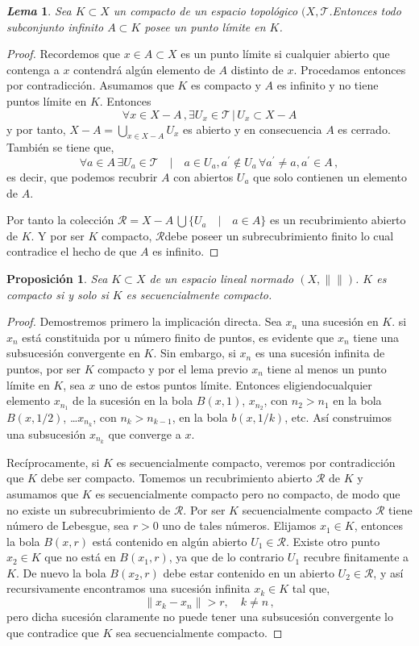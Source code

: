 \documentclass[12pt]{book}
\newtheorem{prop}{\bf Proposición}[chapter]
\newtheorem{lema}{\it Lema}[chapter]
\newcommand{\norm}[1]{\lVert #1\rVert }
\begin{document}
\begin{lema}
Sea $K\subset X$ un  compacto  de un espacio topológico $(X,\mathcal{T}$.Entonces todo 
subconjunto infinito $A\subset K$ posee un punto límite en $K$.
\end{lema}
\begin{proof}
Recordemos que $x\in A\subset X$ es un punto límite  si cualquier abierto  que contenga a $x$ 
contendrá algún elemento de $A$ distinto de $x$.  Procedamos entonces  por contradicción. 
Asumamos que  $K$ es compacto y $A$ es infinito y no tiene puntos límite en $K$. Entonces 
$$\forall x\in X-A\,, \exists U_x\in\mathcal{T}\,|\, U_x\subset X-A$$ 
y por tanto, $X-A=\bigcup_{x\in X-A} U_x$ es abierto y en consecuencia   $A$ es cerrado. También 
se tiene que,
$$\forall a\in A\,\exists  U_a\in\mathcal{T}\quad|\quad a\in U_a, a^\prime\not\in U_a\,\forall 
a^\prime\not=a, a^\prime\in A\,,$$
es decir, que podemos recubrir $A$ con abiertos $U_a$ que solo contienen un elemento de $A$.

Por tanto la colección $\mathcal{R}=X-A\,\bigcup \{ U_a \quad|\quad a\in A\}$ es un recubrimiento 
abierto de $K$. Y por ser $K$ compacto, $\mathcal{R}$debe poseer  un subrecubrimiento finito lo 
cual contradice el hecho de que $A$ es  infinito.
\end{proof}
\begin{prop}
Sea  $K\subset X$  de un espacio lineal normado $(X,\norm{})$. $K$ es compacto si y solo  si $K$ 
es secuencialmente compacto.
\end{prop}
\begin{proof}
Demostremos primero la implicación directa. Sea $x_n$ una sucesión en $K$. si $x_n$ está 
constituida por u número finito de puntos, es evidente que $x_n$ tiene una subsucesión 
convergente en $K$. Sin embargo, si $x_n$  es una sucesión infinita de puntos,  por ser $K$ 
compacto y por el lema previo $x_n$ tiene al menos   un punto límite en $K$, sea $x$ uno de estos 
puntos límite. Entonces eligiendocualquier elemento $x_{n_1}$ de la sucesión en la bola $B(x,1)$, 
$x_{n_2}$, con $n_2> n_1$ en la bola $B(x,1/2)$, \dots $x_{n_k}$, con $n_k>n_{k-1}$, en la bola 
$b(x,1/k)$, etc. Así construimos una subsucesión  $x_{n_k}$ que converge a $x$.

 Recíprocamente, si $K$ es secuencialmente compacto, veremos por contradicción que $K$ debe 
ser compacto. Tomemos un recubrimiento abierto $\mathcal{R}$  de $K$ y asumamos que $K$  es 
secuencialmente compacto pero no compacto, de modo que no existe un subrecubrimiento de $
\mathcal{R}$. Por ser $K$ secuencialmente compacto $\mathcal{R}$ tiene número de Lebesgue, 
sea $r>0$ uno de tales números. Elijamos $x_1\in K$, entonces la bola $B(x,r)$ está contenido en 
algún abierto $U_1\in \mathcal{R}$. Existe otro punto $x_2\in K$ que no está en $B(x_1,r)$, ya que 
de lo contrario $U_1$ recubre finitamente a $K$. De nuevo la bola $B(x_2,r)$ debe estar contenido 
en un abierto  $U_2\in \mathcal{R}$, y así recursivamente encontramos una sucesión infinita 
$x_k\in K$  tal que,
$$\norm{x_k-x_n}>r,\quad k\not= n\,,$$
pero dicha sucesión claramente no puede tener una subsucesión convergente lo que contradice 
que $K$ sea secuencialmente compacto.

\end{proof}
\end{document}
